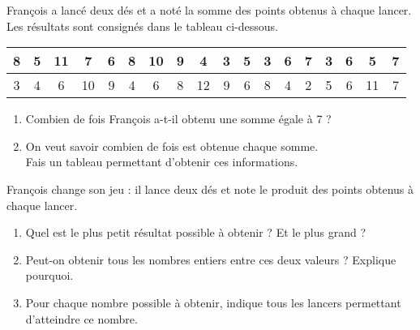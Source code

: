 \begin{myenumerate}
  \item\hfill\newline{}
  \item François a lancé deux dés et a noté la somme des points obtenus à chaque lancer. Les résultats sont consignés dans le tableau ci-dessous.
    \begin{center}
      \begin{tabular}{|*{18}{c|}}
        \hline
        8&5&11&7&6&8&10&9&4&3&5&3&6&7&3&6&5&7\\
        \hline
        3&4&6&10&9&4&6&8&12&9&6&8&4&2&5&6&11&7\\
        \hline
      \end{tabular}
    \end{center}
    \begin{enumerate}
    \item Combien de fois François a-t-il obtenu une somme égale à 7 ?
    \item On veut savoir combien de fois est obtenue chaque somme.\\Fais un tableau permettant d'obtenir ces informations.
  \end{enumerate}
\item François change son jeu : il lance deux dés et note le
  produit des points obtenus à chaque lancer.
  \begin{enumerate}
  \item Quel est le plus petit résultat possible à obtenir ? Et le
    plus grand ?
  \item Peut-on obtenir tous les nombres entiers entre ces deux valeurs ?
    Explique pourquoi.
  \item Pour chaque nombre possible à obtenir, indique tous les
    lancers permettant d'atteindre ce nombre.
  \end{enumerate}
\end{myenumerate}